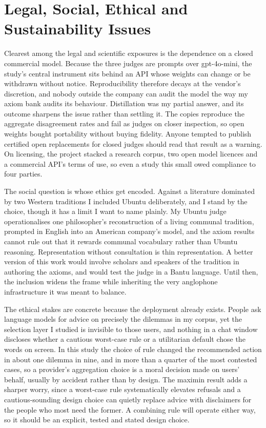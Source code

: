 \documentclass[11pt,a4paper]{article}
\begin{document}
\section*{Legal, Social, Ethical and Sustainability Issues}

Clearest among the legal and scientific exposures is the dependence on a closed commercial model. Because the three judges are prompts over gpt-4o-mini, the study's central instrument sits behind an API whose weights can change or be withdrawn without notice. Reproducibility therefore decays at the vendor's discretion, and nobody outside the company can audit the model the way my axiom bank audits its behaviour. Distillation was my partial answer, and its outcome sharpens the issue rather than settling it. The copies reproduce the aggregate disagreement rates and fail as judges on closer inspection, so open weights bought portability without buying fidelity. Anyone tempted to publish certified open replacements for closed judges should read that result as a warning. On licensing, the project stacked a research corpus, two open model licences and a commercial API's terms of use, so even a study this small owed compliance to four parties.

The social question is whose ethics get encoded. Against a literature dominated by two Western traditions I included Ubuntu deliberately, and I stand by the choice, though it has a limit I want to name plainly. My Ubuntu judge operationalises one philosopher's reconstruction of a living communal tradition, prompted in English into an American company's model, and the axiom results cannot rule out that it rewards communal vocabulary rather than Ubuntu reasoning. Representation without consultation is thin representation. A better version of this work would involve scholars and speakers of the tradition in authoring the axioms, and would test the judge in a Bantu language. Until then, the inclusion widens the frame while inheriting the very anglophone infrastructure it was meant to balance.

The ethical stakes are concrete because the deployment already exists. People ask language models for advice on precisely the dilemmas in my corpus, yet the selection layer I studied is invisible to those users, and nothing in a chat window discloses whether a cautious worst-case rule or a utilitarian default chose the words on screen. In this study the choice of rule changed the recommended action in about one dilemma in nine, and in more than a quarter of the most contested cases, so a provider's aggregation choice is a moral decision made on users' behalf, usually by accident rather than by design. The maximin result adds a sharper worry, since a worst-case rule systematically elevates refusals and a cautious-sounding design choice can quietly replace advice with disclaimers for the people who most need the former. A combining rule will operate either way, so it should be an explicit, tested and stated design choice.
\end{document}
